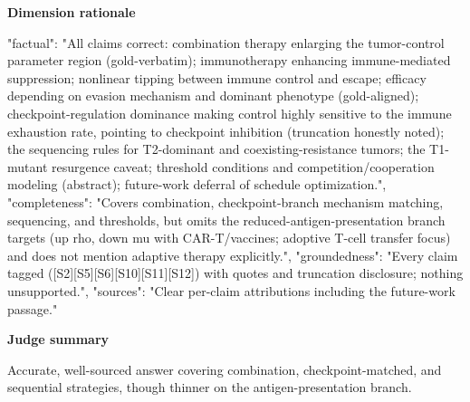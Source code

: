 \documentclass[10pt]{article}
\begin{document}
\textbf{Dimension rationale}
\begin{EvidenceText}
{
  "factual": "All claims correct: combination therapy enlarging the tumor-control parameter region (gold-verbatim); immunotherapy enhancing immune-mediated suppression; nonlinear tipping between immune control and escape; efficacy depending on evasion mechanism and dominant phenotype (gold-aligned); checkpoint-regulation dominance making control highly sensitive to the immune exhaustion rate, pointing to checkpoint inhibition (truncation honestly noted); the sequencing rules for T2-dominant and coexisting-resistance tumors; the T1-mutant resurgence caveat; threshold conditions and competition/cooperation modeling (abstract); future-work deferral of schedule optimization.",
  "completeness": "Covers combination, checkpoint-branch mechanism matching, sequencing, and thresholds, but omits the reduced-antigen-presentation branch targets (up rho, down mu with CAR-T/vaccines; adoptive T-cell transfer focus) and does not mention adaptive therapy explicitly.",
  "groundedness": "Every claim tagged ([S2][S5][S6][S10][S11][S12]) with quotes and truncation disclosure; nothing unsupported.",
  "sources": "Clear per-claim attributions including the future-work passage."
}
\end{EvidenceText}

\textbf{Judge summary}
\begin{EvidenceText}
Accurate, well-sourced answer covering combination, checkpoint-matched, and sequential strategies, though thinner on the antigen-presentation branch.
\end{EvidenceText}
\end{document}
